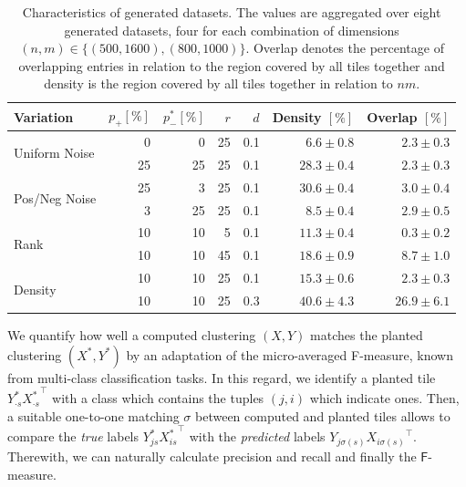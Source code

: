 \begin{table}%
	\centering
	\begin{tabular}{lrrrrrr}\toprule
Variation & $p_+[\%]$ & $p_-^*[\%]$ & $r$ & $d$ & Density $[\%]$ & Overlap $[\%]$ \\ \midrule
\multirow{2}{*}{Uniform Noise} &
0 & 0 & 25 & 0.1 & $6.6\pm0.8$ & $2.3\pm0.3$\\
& 25 & 25 & 25 & 0.1 & $28.3\pm0.4$ & $2.3\pm0.3$\\ \midrule
\multirow{2}{*}{Pos/Neg Noise} &25 & 3 & 25 & 0.1 & $30.6\pm0.4$ & $3.0\pm0.4$\\
 & 3 & 25 & 25 & 0.1 & $8.5\pm0.4$ & $2.9\pm0.5$\\ \midrule
\multirow{2}{*}{Rank} & 10 & 10 & 5 & 0.1 &  $11.3\pm0.4$ & $0.3\pm0.2$\\
 & 10 & 10 & 45 & 0.1 & $18.6\pm0.9$ & $8.7\pm1.0$\\ \midrule
\multirow{2}{*}{Density} & 10 & 10 & 25 & 0.1 & $15.3\pm0.6$ & $2.3\pm0.3$\\
 & 10 & 10 & 25 & 0.3 & $40.6\pm4.3$ & $26.9\pm6.1$\\\bottomrule
\end{tabular}
\caption{Characteristics of generated datasets. The values are aggregated over eight generated datasets, four for each combination of dimensions $(n,m)\in\{(500,1600),(800,1000)\}$. Overlap denotes the percentage of overlapping entries in relation to the region covered by all tiles together and density is the region covered by all tiles together in relation to $nm$.}\label{tbl:statSynthData}
\end{table}

We quantify how well a computed clustering $(X,Y)$  matches the planted clustering $(X^*,Y^*)$ by an adaptation of the micro-averaged F-measure, known from multi-class classification tasks. In this regard, we identify a planted tile $Y^*_{\cdot s }{X^*_{\cdot s}}^\top $  with a class which contains the tuples $(j,i)$ which indicate ones. Then, a suitable  one-to-one matching $\sigma$ between computed and planted tiles allows to compare the \textit{true} labels $Y^*_{j s }{X^*_{i s}}^\top $  with the \textit{predicted} labels $Y_{j \sigma(s) }{X_{i \sigma(s)}}^\top $.
Therewith, we can naturally calculate precision and recall and finally the $\mathsf{F}$-measure. 

